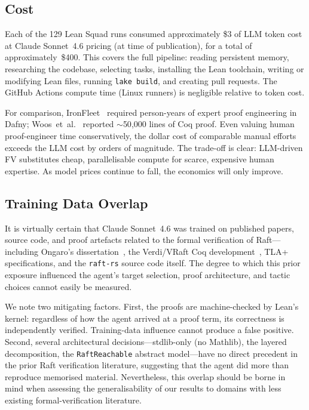 \documentclass[sigconf,10pt]{acmart}
\begin{document}
\subsection{Cost}
\label{sec:cost}

Each of the 129 Lean Squad runs consumed approximately \$3 of LLM
token cost at Claude Sonnet~4.6 pricing (at time of publication), for a total of
approximately~\$400.  This covers the full pipeline: reading
persistent memory, researching the codebase, selecting tasks,
installing the Lean toolchain, writing or modifying Lean files,
running \texttt{lake build}, and creating pull requests.  The
GitHub Actions compute time (Linux runners) is negligible relative
to token cost.

For comparison, IronFleet~\cite{ironfleet} required person-years of
expert proof engineering in Dafny; Woos~et~al.~\cite{vard} reported
$\sim$50{,}000 lines of Coq proof.  Even valuing human proof-engineer
time conservatively, the dollar cost of comparable manual efforts
exceeds the LLM cost by orders of magnitude.  The trade-off is clear:
LLM-driven FV substitutes cheap, parallelisable compute for scarce,
expensive human expertise.  As model prices continue to fall, the
economics will only improve.

\subsection{Training Data Overlap}
\label{sec:training}

It is virtually certain that Claude Sonnet~4.6 was trained on published
papers, source code, and proof artefacts related to the formal
verification of Raft---including Ongaro's dissertation~\cite{ongaro2014dissertation},
the Verdi/VRaft Coq development~\cite{vard}, TLA+ specifications, and
the \texttt{raft-rs} source code itself.  The degree to which this
prior exposure influenced the agent's target selection, proof
architecture, and tactic choices cannot easily be measured.

We note two mitigating factors.  First, the proofs are machine-checked
by Lean's kernel: regardless of how the agent arrived at a proof term,
its correctness is independently verified.  Training-data influence
cannot produce a false positive.  Second, several architectural
decisions---stdlib-only (no Mathlib), the layered decomposition, the
\texttt{RaftReachable} abstract model---have no direct precedent in the
prior Raft verification literature, suggesting that the agent did more
than reproduce memorised material.  Nevertheless, this overlap should
be borne in mind when assessing the generalisability of our results to
domains with less existing formal-verification literature.
\end{document}

